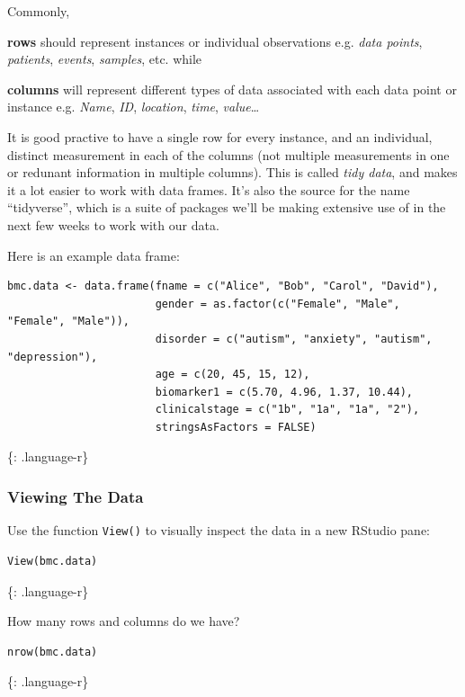\documentclass[]{article}
\begin{document}
Commonly,

\textbf{rows} should represent instances or individual observations e.g.
\emph{data points}, \emph{patients}, \emph{events}, \emph{samples}, etc.
while

\textbf{columns} will represent different types of data associated with
each data point or instance e.g. \emph{Name}, \emph{ID},
\emph{location}, \emph{time}, \emph{value}\ldots{}

It is good practive to have a single row for every instance, and an
individual, distinct measurement in each of the columns (not multiple
measurements in one or redunant information in multiple columns). This
is called \emph{tidy data}, and makes it a lot easier to work with data
frames. It's also the source for the name ``tidyverse'', which is a
suite of packages we'll be making extensive use of in the next few weeks
to work with our data.

Here is an example data frame:

\begin{verbatim}
bmc.data <- data.frame(fname = c("Alice", "Bob", "Carol", "David"),
                       gender = as.factor(c("Female", "Male", "Female", "Male")),
                       disorder = c("autism", "anxiety", "autism", "depression"),
                       age = c(20, 45, 15, 12),
                       biomarker1 = c(5.70, 4.96, 1.37, 10.44),
                       clinicalstage = c("1b", "1a", "1a", "2"),
                       stringsAsFactors = FALSE)
\end{verbatim}

\{: .language-r\}

\subsubsection{Viewing The Data}\label{viewing-the-data}

Use the function \texttt{View()} to visually inspect the data in a new
RStudio pane:

\begin{verbatim}
View(bmc.data)
\end{verbatim}

\{: .language-r\}

How many rows and columns do we have?

\begin{verbatim}
nrow(bmc.data)
\end{verbatim}

\{: .language-r\}
\end{document}
